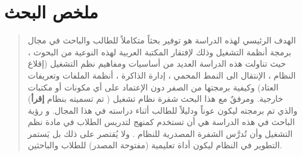 \documentclass[document.tex]{subfiles}
\begin{document}
\chapter*{\centering ملخص البحث}
\begin{quotation}

\noindent الهدف الرئيسي لهذه الدراسة هو توفير بحثاً متكاملاً للطالب والباحث في مجال برمجة أنظمة التشغيل وذلك لإفتقار المكتبة العربية لهذه النوعية من البحوث ، حيث تناولت هذه الدراسة  العديد من أساسيات ومفاهيم نظم التشغيل (إقلاع النظام ، الإنتقال الى النمط المحمي ، إدارة الذاكرة ، أنظمة الملفات وتعريفات العتاد) وكيفية برمجتها من الصفر دون الإعتماد على أي مكونات أو مكتبات خارجية. ومرفقٌ مع هذا البحث شفرة نظام تشغيل ( تم تسميته بنظام \textbf{إقرأ}) والذي تم برمجته ليكون عوناً ودليلاً للطالب أثناء دراسته في هذا المجال.
\noindent و رؤية الباحث في هذه الدراسة هي أن تستخدم كمنهج لتدريس الطلاب في مادة نظم التشغيل وأن تُدرَّس الشفرة المصدرية للنظام . ولا يُقتصر على ذلك بل يَستمر التطوير في النظام ليكون أداة تعليمية (مفتوحة المصدر) للطلاب والباحثين.


\end{quotation}
\end{document}
